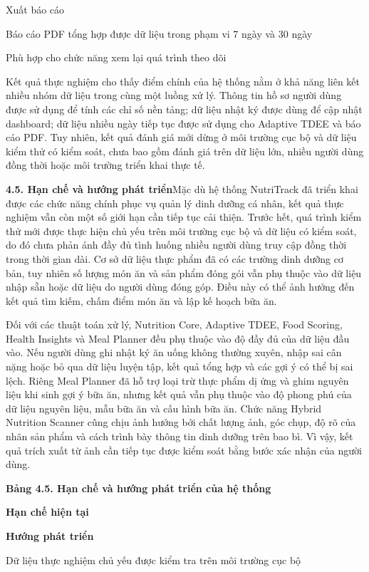 Xuất báo cáo

Báo cáo PDF tổng hợp được dữ liệu trong phạm vi 7 ngày và 30 ngày

Phù hợp cho chức năng xem lại quá trình theo dõi

Kết quả thực nghiệm cho thấy điểm chính của hệ thống nằm ở khả năng liên kết nhiều nhóm dữ liệu trong cùng một luồng xử lý. Thông tin hồ sơ người dùng được sử dụng để tính các chỉ số nền tảng; dữ liệu nhật ký được dùng để cập nhật dashboard; dữ liệu nhiều ngày tiếp tục được sử dụng cho Adaptive TDEE và báo cáo PDF. Tuy nhiên, kết quả đánh giá mới dừng ở môi trường cục bộ và dữ liệu kiểm thử có kiểm soát, chưa bao gồm đánh giá trên dữ liệu lớn, nhiều người dùng đồng thời hoặc môi trường triển khai thực tế.

\textbf{4.5. Hạn chế và hướng phát triển}Mặc dù hệ thống NutriTrack đã triển khai được các chức năng chính phục vụ quản lý dinh dưỡng cá nhân, kết quả thực nghiệm vẫn còn một số giới hạn cần tiếp tục cải thiện. Trước hết, quá trình kiểm thử mới được thực hiện chủ yếu trên môi trường cục bộ và dữ liệu có kiểm soát, do đó chưa phản ánh đầy đủ tình huống nhiều người dùng truy cập đồng thời trong thời gian dài. Cơ sở dữ liệu thực phẩm đã có các trường dinh dưỡng cơ bản, tuy nhiên số lượng món ăn và sản phẩm đóng gói vẫn phụ thuộc vào dữ liệu nhập sẵn hoặc dữ liệu do người dùng đóng góp. Điều này có thể ảnh hưởng đến kết quả tìm kiếm, chấm điểm món ăn và lập kế hoạch bữa ăn.

Đối với các thuật toán xử lý, Nutrition Core, Adaptive TDEE, Food Scoring, Health Insights và Meal Planner đều phụ thuộc vào độ đầy đủ của dữ liệu đầu vào. Nếu người dùng ghi nhật ký ăn uống không thường xuyên, nhập sai cân nặng hoặc bỏ qua dữ liệu luyện tập, kết quả tổng hợp và các gợi ý có thể bị sai lệch. Riêng Meal Planner đã hỗ trợ loại trừ thực phẩm dị ứng và ghim nguyên liệu khi sinh gợi ý bữa ăn, nhưng kết quả vẫn phụ thuộc vào độ phong phú của dữ liệu nguyên liệu, mẫu bữa ăn và cấu hình bữa ăn. Chức năng Hybrid Nutrition Scanner cũng chịu ảnh hưởng bởi chất lượng ảnh, góc chụp, độ rõ của nhãn sản phẩm và cách trình bày thông tin dinh dưỡng trên bao bì. Vì vậy, kết quả trích xuất từ ảnh cần tiếp tục được kiểm soát bằng bước xác nhận của người dùng.

\textbf{Bảng 4.5. Hạn chế và hướng phát triển của hệ thống}

\textbf{Hạn chế hiện tại}

\textbf{Hướng phát triển}

Dữ liệu thực nghiệm chủ yếu được kiểm tra trên môi trường cục bộ

